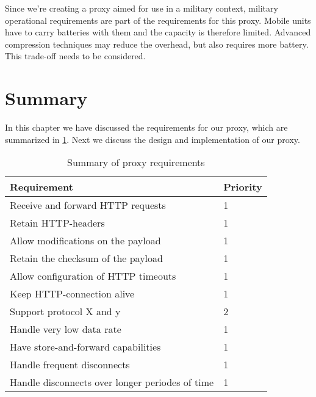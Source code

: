 Since we're creating a proxy aimed for use in a military context, military
operational requirements are part of the requirements for this proxy. Mobile
units have to carry batteries with them and the capacity is therefore limited.
Advanced compression techniques may reduce the overhead, but also requires more
battery. This trade-off needs to be considered.


\section{Summary}

In this chapter we have discussed the requirements for our proxy, which are
summarized in \cref{table-proxy-requirements}. Next we discuss the design and
implementation of our proxy.


\begin{table}[h]
\begin{tabular}{| l | l |}
\hline
  \textbf{Requirement} & \textbf{Priority} \\ \hline
  Receive and forward HTTP requests & 1\\ \hline
  Retain HTTP-headers & 1\\ \hline
  Allow modifications on the payload & 1 \\ \hline
  Retain the checksum of the payload & 1 \\ \hline
  Allow configuration of HTTP timeouts & 1 \\ \hline
  Keep HTTP-connection alive & 1 \\ \hline
  Support protocol X and y & 2 \\ \hline
  Handle very low data rate & 1 \\ \hline
  Have store-and-forward capabilities & 1 \\ \hline
  Handle frequent disconnects & 1\\ \hline
  Handle disconnects over longer periodes of time & 1\\ \hline
\end{tabular}
\caption{Summary of proxy requirements}
\label{table-proxy-requirements}
\end{table}
